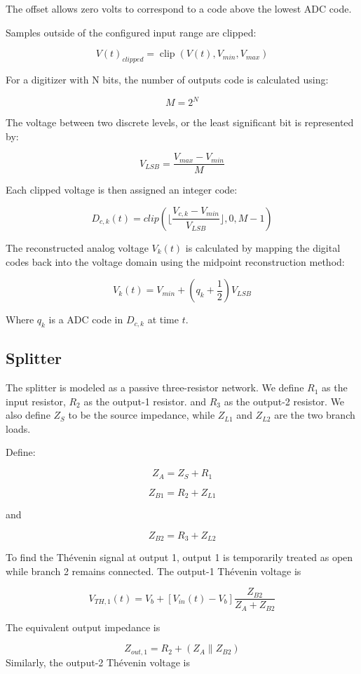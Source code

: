 \documentclass[10pt]{article}
\begin{document}
The offset allows zero volts to correspond to a code above the lowest ADC code. 

Samples outside of the configured input range are clipped: 

$$
V(t)_{clipped} = \operatorname{clip}(V(t), V_{min}, V_{max})
$$

For a digitizer with N bits, the number of outputs code is calculated using: 

$$
M = 2^N
$$

The voltage between two discrete levels, or the least significant bit is represented by: 

$$
V_{LSB} = \frac{V_{max} - V_{min}}{M}
$$

Each clipped voltage is then assigned an integer code: 

$$
D_{c,k}(t) = clip(\lfloor \frac{V_{c,k} - V_{min} }{V_{LSB}}\rfloor, 0, M - 1)
$$

The reconstructed analog voltage $V_k(t)$ is calculated by mapping the digital codes back into the voltage domain using the midpoint reconstruction method:

$$
V_k(t) = V_{min} + (q_k + \frac{1}{2})V_{LSB}
$$

Where $q_k$ is a ADC code in $D_{c,k}$ at time $t$. 


\subsection{Splitter}
The splitter is modeled as a passive three-resistor network. We define $R_1$ as the input resistor, $R_2$ as the output-1 resistor. and $R_3$ as the output-2 resistor. We also define $Z_S$ to be the source impedance, while $Z_{L1}$ and $Z_{L2}$ are the two branch loads.

Define: 

$$
Z_{A} = Z_S + R_1
$$

$$
Z_{B1} = R_2 + Z_{L1}
$$

and 

$$
Z_{B2} = R_3 + Z_{L2}
$$

To find the Thévenin signal at output 1, output 1 is temporarily treated as open while branch 2 remains connected. The output-1 Thévenin voltage is

$$
V_{TH,1}(t) = V_b + [V_{in}(t)-V_b] \frac{Z_{B2}}{Z_A+Z_{B2}}
$$

The equivalent output impedance is

$$
Z_{out,1} = R_2 + (Z_A \parallel Z_{B2})
$$
Similarly, the output-2 Thévenin voltage is
\end{document}
